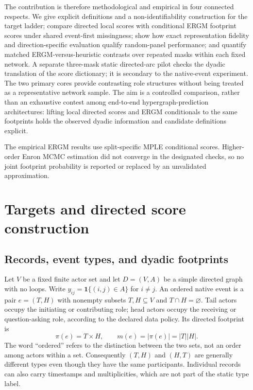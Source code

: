 \documentclass[10pt]{article}
\newcommand{\ind}{\mathbf{1}}
\begin{document}
The contribution is therefore methodological and empirical in four connected respects. We give explicit definitions and a non-identifiability construction for the target ladder; compare directed local scores with conditional ERGM footprint scores under shared event-first missingness; show how exact representation fidelity and direction-specific evaluation qualify random-panel performance; and quantify matched ERGM-versus-heuristic contrasts over repeated masks within each fixed network. A separate three-mask static directed-arc pilot checks the dyadic translation of the score dictionary; it is secondary to the native-event experiment. The two primary cores provide contrasting role structures without being treated as a representative network sample. The aim is a controlled comparison, rather than an exhaustive contest among end-to-end hypergraph-prediction architectures: lifting local directed scores and ERGM conditionals to the same footprints holds the observed dyadic information and candidate definitions explicit.

The empirical ERGM results use split-specific MPLE conditional scores. Higher-order Enron MCMC estimation did not converge in the designated checks, so no joint footprint probability is reported or replaced by an unvalidated approximation.

\section{Targets and directed score construction}
\subsection{Records, event types, and dyadic footprints}
Let $V$ be a fixed finite actor set and let $D=(V,A)$ be a simple directed graph with no loops. Write $y_{ij}=\ind\{(i,j)\in A\}$ for $i\ne j$. An ordered native event is a pair $e=(T,H)$ with nonempty subsets $T,H\subseteq V$ and $T\cap H=\varnothing$. Tail actors occupy the initiating or contributing role; head actors occupy the receiving or question-asking role, according to the declared data policy. Its directed footprint is
\begin{equation}
\pi(e)=T\times H,\qquad m(e)=|\pi(e)|=|T||H|.
\label{eq:footprint}
\end{equation}
The word ``ordered'' refers to the distinction between the two sets, not an order among actors within a set. Consequently $(T,H)$ and $(H,T)$ are generally different types even though they have the same participants. Individual records can also carry timestamps and multiplicities, which are not part of the static type label.
\end{document}
